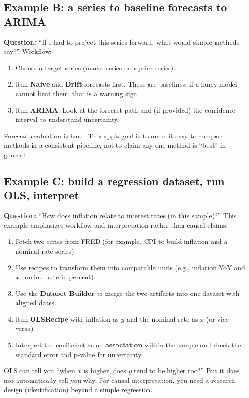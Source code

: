 \documentclass[11pt,a4paper]{article}
\begin{document}
\subsection{Example B: a series to baseline forecasts to ARIMA}
\textbf{Question:} ``If I had to project this series forward, what would simple methods say?''\newline
Workflow:
\begin{enumerate}[leftmargin=2.2em]
  \item Choose a target series (macro series or a price series).
  \item Run \textbf{Naive} and \textbf{Drift} forecasts first. These are baselines: if a fancy model cannot beat them, that is a warning sign.
  \item Run \textbf{ARIMA}. Look at the forecast path and (if provided) the confidence interval to understand uncertainty.
\end{enumerate}
\begin{intuitionbox}
Forecast evaluation is hard. This app’s goal is to make it easy to compare methods in a consistent pipeline, not to claim any one method is ``best'' in general.
\end{intuitionbox}

\subsection{Example C: build a regression dataset, run OLS, interpret}
\textbf{Question:} ``How does inflation relate to interest rates (in this sample)?''\newline
This example emphasizes workflow and interpretation rather than causal claims.
\begin{enumerate}[leftmargin=2.2em]
  \item Fetch two series from FRED (for example, CPI to build inflation and a nominal rate series).
  \item Use recipes to transform them into comparable units (e.g., inflation YoY and a nominal rate in percent).
  \item Use the \textbf{Dataset Builder} to merge the two artifacts into one dataset with aligned dates.
  \item Run \textbf{OLSRecipe} with inflation as \(y\) and the nominal rate as \(x\) (or vice versa).
  \item Interpret the coefficient as an \textbf{association} within the sample and check the standard error and p-value for uncertainty.
\end{enumerate}
\begin{intuitionbox}
OLS can tell you ``when \(x\) is higher, does \(y\) tend to be higher too?'' But it does not automatically tell you why. For causal interpretation, you need a research design (identification) beyond a simple regression.
\end{intuitionbox}
\end{document}

